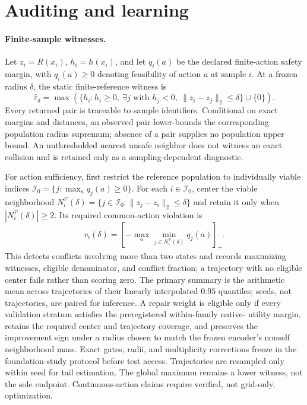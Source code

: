 \section{Auditing and learning}

\paragraph{Finite-sample witnesses.}
Let $z_i=R(x_i)$, $h_i=h(x_i)$, and let $q_i(a)$ be the declared finite-action safety margin, with
$q_i(a)\geq0$ denoting feasibility of action $a$ at sample $i$.  At a frozen radius $\delta$, the
static finite-reference witness is
\[
 \widehat\varepsilon_\delta
 =\max\!\left(\{h_i:h_i\geq0,\ \exists j\text{ with }h_j<0,
 \ \|z_i-z_j\|_2\leq\delta\}\cup\{0\}\right).
\]
Every returned pair is traceable to sample identifiers.  Conditional on exact margins and
distances, an observed pair lower-bounds the corresponding population radius supremum; absence of
a pair supplies no population upper bound.  An unthresholded nearest unsafe neighbor does not
witness an exact collision and is retained only as a sampling-dependent diagnostic.

For action sufficiency, first restrict the reference population to individually viable indices
$\mathcal I_0=\{j:\max_a q_j(a)\geq0\}$.  For each $i\in\mathcal I_0$, center the viable
neighborhood
$N_i^{\mathcal V}(\delta)=\{j\in\mathcal I_0:\|z_j-z_i\|_2\leq\delta\}$ and retain it only when
$|N_i^{\mathcal V}(\delta)|\geq2$.  Its required common-action violation is
\[
 v_i(\delta)=\left[-\max_a\min_{j\in N_i^{\mathcal V}(\delta)}q_j(a)\right]_+.
\]
This detects conflicts involving more than two states and records maximizing witnesses, eligible
denominator, and conflict fraction; a trajectory with no eligible center fails rather than scoring
zero.  The primary summary is the arithmetic mean across trajectories of their linearly
interpolated $0.95$ quantiles; seeds, not trajectories, are paired for inference.  A repair weight
is eligible only if every validation stratum satisfies the preregistered within-family native-
utility margin, retains the required center and trajectory coverage, and preserves the improvement
sign under a radius chosen to match the frozen encoder's nonself neighborhood mass.  Exact gates,
radii, and multiplicity corrections freeze in the foundation-study protocol before test access.
Trajectories are resampled only within seed for tail estimation.  The global maximum remains a lower
witness, not the sole endpoint.  Continuous-action claims require verified, not grid-only, optimization.

